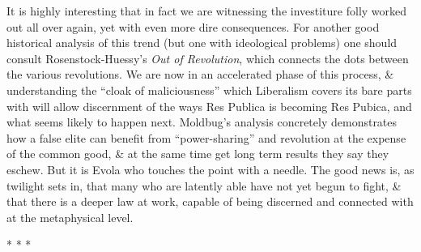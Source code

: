 It is highly interesting that in fact we are witnessing the investiture folly worked out all over again, yet with even more dire consequences. For another good historical analysis of this trend (but one with ideological problems) one should consult Rosenstock-Huessy's \emph{Out of Revolution}, which connects the dots between the various revolutions. We are now in an accelerated phase of this process, \& understanding the ``cloak of maliciousness'' which Liberalism covers its bare parts with will allow discernment of the ways Res Publica is becoming Res Pubica, and what seems likely to happen next. Moldbug's analysis concretely demonstrates how a false elite can benefit from ``power-sharing'' and revolution at the expense of the common good, \& at the same time get long term results they say they eschew. But it is Evola who touches the point with a needle. The good news is, as twilight sets in, that many who are latently able have not yet begun to fight, \& that there is a deeper law at work, capable of being discerned and connected with at the metaphysical level.



\begin{center}* * *\end{center}


